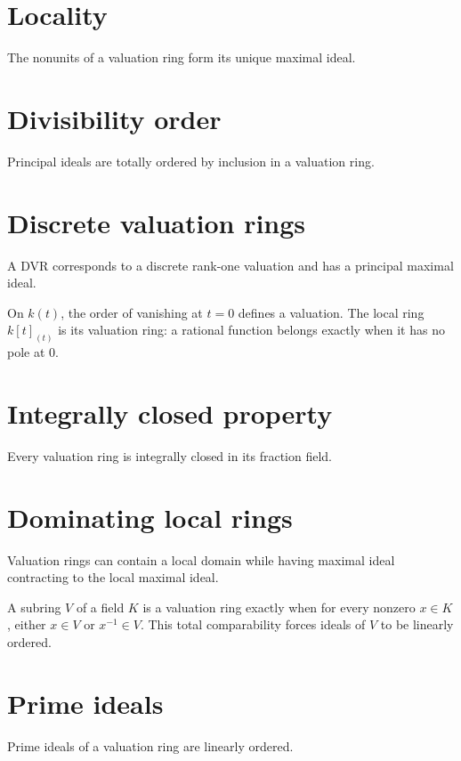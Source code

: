 \section{Locality}
The nonunits of a valuation ring form its unique maximal ideal.

\section{Divisibility order}
Principal ideals are totally ordered by inclusion in a valuation ring.

\section{Discrete valuation rings}
A DVR corresponds to a discrete rank-one valuation and has a principal maximal ideal.

\begin{example}\label{ex:v21-expand-02}
On $k(t)$, the order of vanishing at $t=0$ defines a valuation. The local ring $k[t]_{(t)}$ is its valuation ring: a rational function belongs exactly when it has no pole at $0$.
\end{example}
\section{Integrally closed property}
Every valuation ring is integrally closed in its fraction field.

\section{Dominating local rings}
Valuation rings can contain a local domain while having maximal ideal contracting to the local maximal ideal.

\begin{example}[Either $x$ or $x^{-1}$]\label{ex:v21-expand-03}
A subring $V$ of a field $K$ is a valuation ring exactly when for every nonzero $x\in K$, either $x\in V$ or $x^{-1}\in V$. This total comparability forces ideals of $V$ to be linearly ordered.
\end{example}
\section{Prime ideals}
Prime ideals of a valuation ring are linearly ordered.

